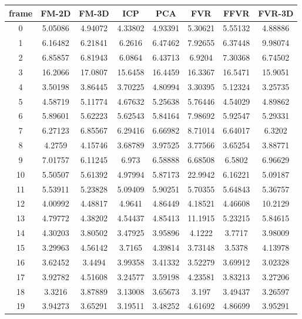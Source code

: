 
\begin{figure}
\centering
\begin{tabular}{cccccccc}
\hline
\textbf{frame} & \textbf{FM-2D} & \textbf{FM-3D} & \textbf{ICP} & \textbf{PCA} & \textbf{FVR} & \textbf{FFVR} & \textbf{FVR-3D}
\\ \hline
0 & 5.05086 & 4.94072 & 4.33802 & 4.93391 & 5.30621 & 5.55132 & 4.88886\\
1 & 6.16482 & 6.21841 & 6.2616 & 6.47462 & 7.92655 & 6.37448 & 9.98074\\
2 & 6.85857 & 6.81943 & 6.0864 & 6.43713 & 6.9204 & 7.30368 & 6.74502\\
3 & 16.2066 & 17.0807 & 15.6458 & 16.4459 & 16.3367 & 16.5471 & 15.9051\\
4 & 3.50198 & 3.86445 & 3.70225 & 4.80994 & 3.30395 & 5.12324 & 3.25735\\
5 & 4.58719 & 5.11774 & 4.67632 & 5.25638 & 5.76446 & 4.54029 & 4.89862\\
6 & 5.89601 & 5.62223 & 5.62543 & 5.84164 & 7.98692 & 5.92547 & 5.29331\\
7 & 6.27123 & 6.85567 & 6.29416 & 6.66982 & 8.71014 & 6.64017 & 6.3202\\
8 & 4.2759 & 4.15746 & 3.68789 & 3.97525 & 3.77566 & 3.65254 & 3.88771\\
9 & 7.01757 & 6.11245 & 6.973 & 6.58888 & 6.68508 & 6.5802 & 6.96629\\
10 & 5.50507 & 5.61392 & 4.97994 & 5.87173 & 22.9942 & 6.16221 & 5.09187\\
11 & 5.53911 & 5.23828 & 5.09409 & 5.90251 & 5.70355 & 5.64843 & 5.36757\\
12 & 4.00992 & 4.48817 & 4.9641 & 4.86449 & 4.18521 & 4.46608 & 10.2129\\
13 & 4.79772 & 4.38202 & 4.54437 & 4.85413 & 11.1915 & 5.23215 & 5.84615\\
14 & 4.30203 & 3.80502 & 3.47925 & 3.95896 & 4.1222 & 3.7717 & 3.98009\\
15 & 3.29963 & 4.56142 & 3.7165 & 4.39814 & 3.73148 & 3.5378 & 4.13978\\
16 & 3.62452 & 3.4494 & 3.99358 & 3.41332 & 3.52279 & 3.69912 & 3.02328\\
17 & 3.92782 & 4.51608 & 3.24577 & 3.59198 & 4.23581 & 3.83213 & 3.27206\\
18 & 3.3216 & 3.87889 & 3.13008 & 3.65673 & 3.197 & 3.49437 & 3.26597\\
19 & 3.94273 & 3.65291 & 3.19511 & 3.48252 & 4.61692 & 4.86699 & 3.95291\\

\end{tabular}
\end{figure}
